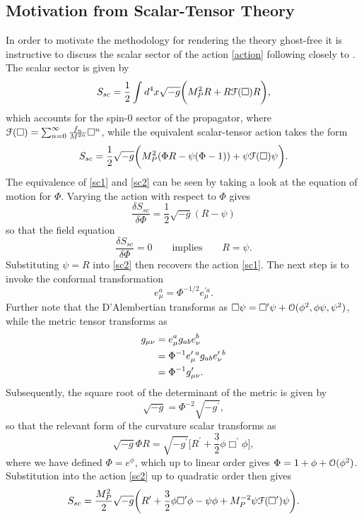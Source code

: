 \subsection{Motivation from Scalar-Tensor Theory}
\label{sec:GFST}
In order to motivate the methodology for rendering the theory ghost-free it is instructive to discuss the scalar sector of the action \eqref{action} following closely to \cite{Biswas:2005qr}. The scalar sector is given by
\[
\label{sc1}
S_{sc}=\frac{1}{2}\int d^4 x \sqrt{-g} \biggl(M_P^2 R+R{\cal F}(\Box)R\biggr)
,\]
which accounts for the spin-0 sector of the propagator, where ${\cal F}(\Box)=\sum^{\infty}_{n=0}\frac{f_n}{M^{2n}} \Box^n$, while the equivalent scalar-tensor action takes the form
\[
\label{sc2}
S_{sc}=\frac{1}{2}\sqrt{-g}\biggl(M_P^2(\Phi R-\psi(\Phi-1))+\psi {\cal F}(\Box)\psi\biggr).
\]
The equivalence of \eqref{sc1} and \eqref{sc2} can be seen by taking a look at the equation of motion for $\Phi$. Varying the action with respect to $\Phi$ gives
\[
\frac{\delta S_{sc}}{\delta \Phi}=\frac{1}{2}\sqrt{-g}(R-\psi)
\]
so that the field equation
\[
\frac{\delta S_{sc}}{\delta \Phi}=0\qquad\mbox{implies}\qquad R=\psi
.\] 
Substituting $\psi=R$ into \eqref{sc2} then recovers the action \eqref{sc1}. The next step is to invoke the conformal transformation
\[
e_\mu^a=\Phi^{-1/2}e^{\prime a}_\mu
.\]
Further note that the D'Alembertian transforms as $\Box\psi=\Box^\prime\psi +{\cal O}(\phi^2,\phi\psi,\psi^2)$, while the metric tensor transforms as
\begin{align}
g_{\mu\nu}& =e^a_\mu g_{ab} e^b_\nu
\nonumber\\& =\Phi^{-1}e^{\prime\;a}_\mu g_{ab} e^{\prime\;b}_\nu
\nonumber\\& =\Phi^{-1}g^\prime_{\mu\nu}.
\end{align}
Subsequently, the square root of the determinant of the metric is given by
\[
\sqrt{-g}=\Phi^{-2}\sqrt{-g^\prime},
\]
so that the relevant form of the curvature scalar transforms as
\[
\sqrt{-g}\Phi R=\sqrt{-g^{\prime}}\biggl[R^{\prime}+\frac{3}{2}\phi\Box^{\prime}\phi\biggr]
, \]
where we have defined $\Phi=e^\phi$, which up to linear order gives $\Phi=1+\phi+{\cal O}(\phi^2)$. Substitution into the action \eqref{sc2} up to quadratic order then gives
\[
\label{sc3}
S_{sc}=\frac{M_P^2}{2}\sqrt{-g}\biggl( R^\prime+\frac{3}{2}\phi\Box^\prime \phi-\psi\phi+M_P^{-2}\psi {\cal F}(\Box^\prime)\psi\biggr).
\]
